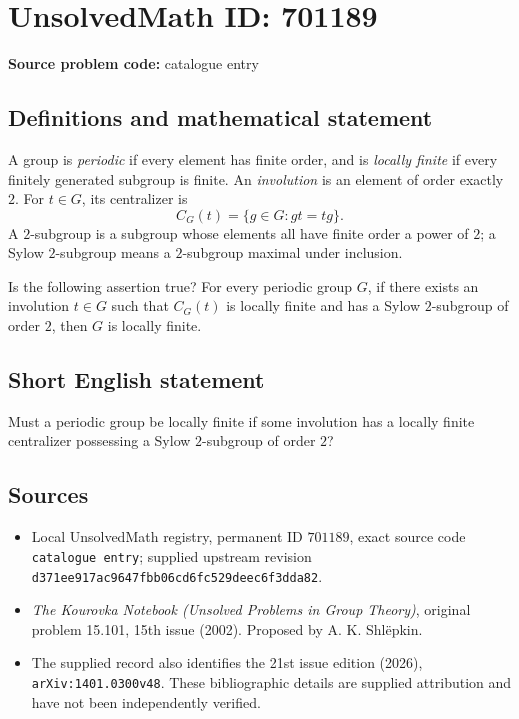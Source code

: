 \documentclass[11pt]{article}
\begin{document}
\section*{UnsolvedMath ID: 701189}
\textbf{Source problem code:} catalogue entry
\subsection{Definitions and mathematical statement}
A group is \emph{periodic} if every element has finite order, and is \emph{locally finite} if every finitely generated subgroup is finite. An \emph{involution} is an element of order exactly \(2\). For \(t\in G\), its centralizer is
\[
C_G(t)=\{g\in G:gt=tg\}.
\]
A \(2\)-subgroup is a subgroup whose elements all have finite order a power of \(2\); a Sylow \(2\)-subgroup means a \(2\)-subgroup maximal under inclusion.

Is the following assertion true? For every periodic group \(G\), if there exists an involution \(t\in G\) such that \(C_G(t)\) is locally finite and has a Sylow \(2\)-subgroup of order \(2\), then \(G\) is locally finite.
\subsection{Short English statement}
Must a periodic group be locally finite if some involution has a locally finite centralizer possessing a Sylow \(2\)-subgroup of order \(2\)?
\subsection{Sources}
\begin{itemize}
\item Local UnsolvedMath registry, permanent ID \(701189\), exact source code \texttt{catalogue entry}; supplied upstream revision \texttt{d371ee917ac9647fbb06cd6fc529deec6f3dda82}.
\item \emph{The Kourovka Notebook (Unsolved Problems in Group Theory)}, original problem 15.101, 15th issue (2002). Proposed by A. K. Shl\"epkin.
\item The supplied record also identifies the 21st issue edition (2026), \texttt{arXiv:1401.0300v48}. These bibliographic details are supplied attribution and have not been independently verified.
\end{itemize}
\end{document}
